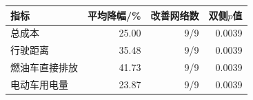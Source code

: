 \begin{tabular}{lrrr}
\toprule
指标 & 平均降幅/\% & 改善网络数 & 双侧$p$值 \\
\midrule
总成本 & 25.00 & 9/9 & 0.0039 \\
行驶距离 & 35.48 & 9/9 & 0.0039 \\
燃油车直接排放 & 41.73 & 9/9 & 0.0039 \\
电动车用电量 & 23.87 & 9/9 & 0.0039 \\
\bottomrule
\end{tabular}
